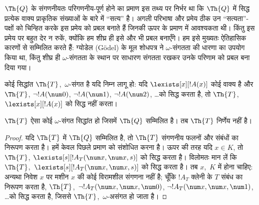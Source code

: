 \documentclass[../../../include/open-logic-section]{subfiles}
\begin{document}


\begin{explain}
$\Th{Q}$ के संगणनीयतः परिगणनीय-पूर्ण होने का प्रमाण इस तथ्य पर निर्भर था कि $\Th{Q}$ में
सिद्ध प्रत्येक वाक्य प्राकृतिक संख्याओं के बारे में ``सत्य'' है। अगली
परिभाषा और प्रमेय ठीक उन ``सत्यता''-पक्षों को चिन्हित करके इस प्रमेय को
प्रबल बनाते हैं जिनकी ऊपर के प्रमाण में आवश्यकता थी। किंतु इस प्रमेय पर
बहुत देर न रुकें, क्योंकि हम शीघ्र ही इसे और भी प्रबल बनाएँगे। हम इसे
मुख्यतः ऐतिहासिक कारणों से सम्मिलित करते हैं: ग्योडेल (G\"odel) के मूल
शोधपत्र ने $\omega$-संगतता की धारणा का उपयोग किया था, किंतु शीघ्र ही
$\omega$-संगतता के स्थान पर साधारण संगतता रखकर उनके परिणाम को प्रबल बना
दिया गया।
\end{explain}

\begin{defn}
कोई सिद्धांत $\Th{T}$,~$\omega$-संगत है यदि निम्न लागू हो: यदि
$\lexists[x][!A(x)]$ कोई वाक्य है और $\Th{T}$,
$\lnot !A(\num 0)$, $\lnot !A(\num 1)$, $\lnot !A(\num 2)$, \dots को
सिद्ध करता है, तो $\Th{T}$,~$\lexists[x][!A(x)]$ को सिद्ध नहीं करता।
\end{defn}

\begin{thm}
  $\Th{T}$ ऐसा कोई $\omega$-संगत सिद्धांत हो जिसमें $\Th{Q}$ सम्मिलित है।
  तब $\Th{T}$ निर्णेय नहीं है।
\end{thm}

\begin{proof}
यदि $\Th{T}$ में $\Th{Q}$ सम्मिलित है, तो $\Th{T}$ संगणनीय फलनों और
संबंधों का निरूपण करता है। हमें केवल पिछले प्रमाण को संशोधित करना है। ऊपर
की तरह यदि $x \in K$, तो $\Th{T}$,
$\lexists[s][!A_T(\num x,\num x, s)]$ को सिद्ध करता है। विलोमतः मान लें
कि $\Th{T}$,~$\lexists[s][!A_T(\num x, \num x, s)]$ को सिद्ध करता है। तब
$x$,~$K$ में होना चाहिए: अन्यथा निवेश $x$ पर मशीन $x$ की कोई विरामशील
संगणना नहीं है; चूँकि $!A_T$ क्लेनी के $T$ संबंध का निरूपण करता है,
$\Th{T}$,~$\lnot !A_T(\num x, \num x, \num 0)$,
$\lnot !A_T(\num x, \num x, \num 1)$, \dots को सिद्ध करता है, जिससे
$\Th{T}$,~$\omega$-असंगत हो जाता है।
\end{proof}
\end{document}
